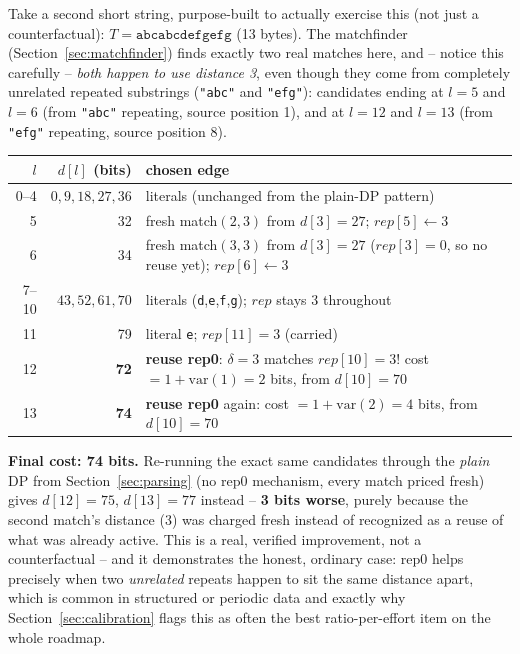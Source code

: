 \documentclass[11pt]{article}
\begin{document}
\begin{tcolorbox}[colback=green!5!white,colframe=green!45!black,title={Worked example: rep0 genuinely winning, traced in full}]
Take a second short string, purpose-built to actually exercise this (not just a
counterfactual): $T = \texttt{abcabcdefgefg}$ (13 bytes). The matchfinder
(Section~\ref{sec:matchfinder}) finds exactly two real matches here, and -- notice this
carefully -- \emph{both happen to use distance 3}, even though they come from
completely unrelated repeated substrings (\texttt{"abc"} and \texttt{"efg"}):
candidates ending at $l{=}5$ and $l{=}6$ (from \texttt{"abc"} repeating, source
position 1), and at $l{=}12$ and $l{=}13$ (from \texttt{"efg"} repeating, source
position 8).
\begin{center}
\begin{tabular}{@{}rrp{9.5cm}@{}}
\toprule
$l$ & $d[l]$ (bits) & chosen edge \\
\midrule
0--4 & $0,9,18,27,36$ & literals (unchanged from the plain-DP pattern) \\
5 & 32 & fresh match$(2,3)$ from $d[3]{=}27$; $rep[5]{\gets}3$ \\
6 & 34 & fresh match$(3,3)$ from $d[3]{=}27$ ($rep[3]{=}0$, so no reuse yet); $rep[6]{\gets}3$ \\
7--10 & $43,52,61,70$ & literals (\texttt{d},\texttt{e},\texttt{f},\texttt{g}); $rep$ stays 3 throughout \\
11 & 79 & literal \texttt{e}; $rep[11]{=}3$ (carried) \\
12 & \textbf{72} & \textbf{reuse rep0}: $\delta{=}3$ matches $rep[10]{=}3$! cost $= 1+\text{var}(1) = 2$ bits, from $d[10]{=}70$ \\
13 & \textbf{74} & \textbf{reuse rep0} again: cost $= 1+\text{var}(2) = 4$ bits, from $d[10]{=}70$ \\
\bottomrule
\end{tabular}
\end{center}
\textbf{Final cost: 74 bits.} Re-running the exact same candidates through the
\emph{plain} DP from Section~\ref{sec:parsing} (no rep0 mechanism, every match priced
fresh) gives $d[12]{=}75$, $d[13]{=}77$ instead -- \textbf{3 bits worse}, purely because
the second match's distance (3) was charged fresh instead of recognized as a reuse of
what was already active. This is a real, verified improvement, not a counterfactual --
and it demonstrates the honest, ordinary case: rep0 helps precisely when two
\emph{unrelated} repeats happen to sit the same distance apart, which is common in
structured or periodic data and exactly why Section~\ref{sec:calibration} flags this as
often the best ratio-per-effort item on the whole roadmap.
\end{tcolorbox}
\end{document}
